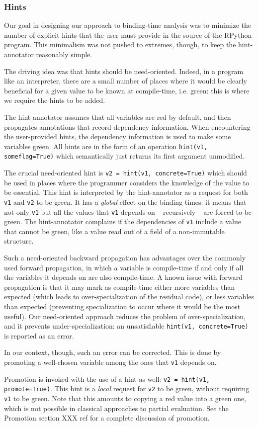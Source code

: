 \subsubsection{Hints}

Our goal in designing our approach to binding-time analysis was to
minimize the number of explicit hints that the user must provide in
the source of the RPython program.  This minimalism was not pushed to
extremes, though, to keep the hint-annotator reasonably simple.  

The driving idea was that hints should be need-oriented.  Indeed, in a
program like an interpreter, there are a small number of places where it
would be clearly beneficial for a given value to be known at
compile-time, i.e. green: this is where we require the hints to be
added.

The hint-annotator assumes that all variables are red by default, and
then propagates annotations that record dependency information.
When encountering the user-provided hints, the dependency information
is used to make some variables green.  All
hints are in the form of an operation \texttt{hint(v1, someflag=True)}
which semantically just returns its first argument unmodified.

The crucial need-oriented hint is \texttt{v2 = hint(v1, concrete=True)}
which should be used in places where the programmer considers the
knowledge of the value to be essential.  This hint is interpreted by
the hint-annotator as a request for both \texttt{v1} and \texttt{v2} to be green.  It
has a \emph{global} effect on the binding times: it means that not only
\texttt{v1} but all the values that \texttt{v1} depends on – recursively –
are forced to be green.  The hint-annotator complains if the
dependencies of \texttt{v1} include a value that cannot be green, like
a value read out of a field of a non-immutable structure.

Such a need-oriented backward propagation has advantages over the
commonly used forward propagation, in which a variable is compile-time
if and only if all the variables it depends on are also compile-time.  A
known issue with forward propagation is that it may mark as compile-time
either more variables than expected (which leads to over-specialization
of the residual code), or less variables than expected (preventing
specialization to occur where it would be the most useful).  Our
need-oriented approach reduces the problem of over-specialization, and
it prevents under-specialization: an unsatisfiable \texttt{hint(v1,
concrete=True)} is reported as an error.

In our context, though, such an error can be corrected.  This is done by
promoting a well-chosen variable among the ones that \texttt{v1} depends on.

Promotion is invoked with the use of a hint as well:
\texttt{v2 = hint(v1, promote=True)}.
This hint is a \emph{local} request for \texttt{v2} to be green, without
requiring \texttt{v1} to be green.  Note that this amounts to copying
a red value into a green one, which is not possible in classical
approaches to partial evaluation.  See the Promotion section XXX ref for a
complete discussion of promotion.


